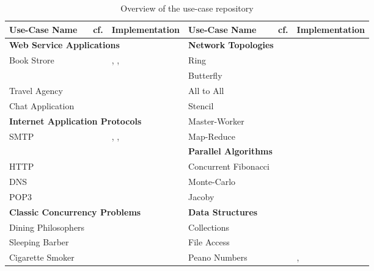 \begin{table}[!h]
\begin{center}
\begin{tabular}{|l|l|l|l|l|l|}
	\hline
	Use-Case Name & cf. & Implementation
	&
	Use-Case Name & cf. & Implementation
	\\

	\hline
	\hline
	\multicolumn{3}{|l|}{ \textbf{Web Service Applications}}
	&
	\multicolumn{3}{|l|}{ \textbf{Network Topologies}}
	\\
	\hline
	Book Strore & \cite{W3C} & \SJ, \Mungo,
	&
	Ring & \cite{BerkleyPar} & \MPI	
	\\
	& & \JavaAPI
	&
	Butterfly & \cite{BerkleyPar} & \MPI
	\\
	Travel Agency & \cite{W3C} & \SJ
	&
	All to All & \cite{BerkleyPar} & \MPI	
	\\
	Chat Application & \cite{SF15} & \Erlang
	&
	Stencil & \cite{BerkleyPar} & \MPI
	\\

	\cline{1-3}
	\cline{1-3}
	\multicolumn{3}{|l|}{ \textbf{Internet Application Protocols}}
	&
	Master-Worker & \cite{BerkleyPar} & \MPI
	\\
	\cline{1-3}
	SMTP & \cite{RFC} & \Mungo, \Links,
	&
	Map-Reduce & \cite{BerkleyPar} & \MPI
	\\
	\cline{4-6}
	\cline{4-6}
	&&\JavaAPI
	&
	\multicolumn{3}{|l|}{ \textbf{Parallel Algorithms}}
	\\
	\cline{4-6}
	HTTP & \cite{RFC} & \JavaAPI
	&
	Concurrent Fibonacci &  & \Mungo
	\\
	DNS & \cite{RFC} & \Erlang
	&
	Monte-Carlo & \cite{citation_needed} & \MPI
	\\
	POP3 & \cite{RFC} & \Mungo
	&
	Jacoby & \cite{citation_needed} & \MPI
	\\

	\hline
	\multicolumn{3}{|l|}{ \textbf{Classic Concurrency Problems}}
	&
	\multicolumn{3}{|l|}{ \textbf{Data Structures}}
	\\
	\hline
	Dining Philosophers & \cite{Savina} & \SPython
	&
	Collections & \cite{mungo} & \Mungo
	\\
	Sleeping Barber & \cite{Savina} & \SPython
	&
	File Access & \cite{mungo} & \Mungo
	\\
	Cigarette Smoker & \cite{Savina} & \SPython
	&
	Peano Numbers & \cite{citation_needed} & \GV, \Links
	\\
	\hline
\end{tabular}
\end{center}
\caption{Overview of the use-case repository}
\label{table:use_cases_all}
\vspace{-10mm}
\end{table}

